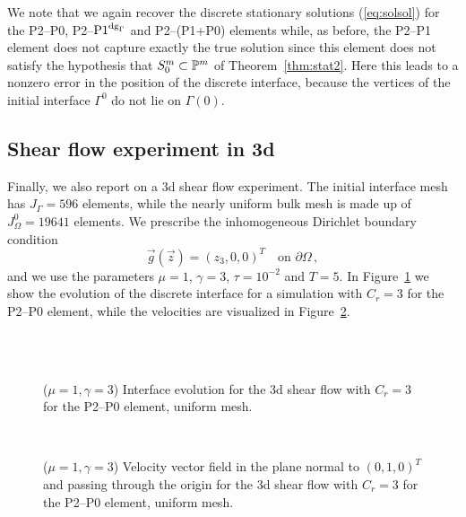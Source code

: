 We note that we again recover the discrete stationary solutions
(\ref{eq:solsol}) for the P2--P0, P2--${\rm P1}^{{\rm dg}_\Gamma}$ and P2--(P1+P0) elements while,
as before, the P2--P1 element does not capture exactly the true solution
since this element does not satisfy the hypothesis that $S^m_0 \subset
\mathbb{P}^m$ of Theorem~\ref{thm:stat2}. Here this leads to a nonzero error in
the position of the discrete interface, because the vertices of the initial
interface $\Gamma^0$ do not lie on $\Gamma(0)$.

\subsection{Shear flow experiment in 3d}
Finally, we also report on a 3d shear flow experiment.
The initial interface mesh has $J_\Gamma = 596$ elements, while the nearly
uniform bulk mesh is made up of $J_\Omega^0 = 19641$ elements. We prescribe the
inhomogeneous Dirichlet boundary condition
\begin{equation*}
\vec g(\vec z)=(z_3,0,0)^T\quad \mbox{on }\partial\Omega\,,
\end{equation*}
and we use the parameters $\mu=1$, $\gamma=3$, $\tau=10^{-2}$ and $T=5$.
In Figure~\ref{fig:shear_3d} we show the evolution of the discrete interface
for a simulation with $C_r=3$ for the P2--P0 element, while the velocities
are visualized in Figure~\ref{fig:shear_3d_velocity}.
\begin{figure}[htbp]
\centering
{}\\
\\
\caption[Stokes 3d shear flow interface]
{($\mu=1,\gamma=3$) Interface evolution for the 3d shear flow with $C_r=3$ for
the P2--P0 element, uniform mesh.}
\label{fig:shear_3d}
\end{figure}
\begin{figure}[htbp]
\centering
{}
\\
\caption[Stokes 3d shear flow velocity]
{($\mu=1,\gamma=3$) Velocity vector field in the plane normal to $(0,1,0)^T$
and passing through the origin for the 3d shear flow with $C_r=3$ for the
P2--P0 element, uniform mesh.}
\label{fig:shear_3d_velocity}
\end{figure}

